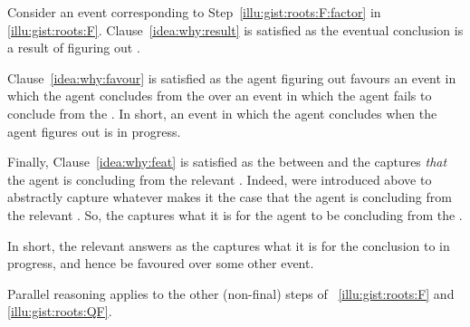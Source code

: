 \begin{note}
  Consider an event corresponding to Step~\ref{illu:gist:roots:F:factor} in \autoref{illu:gist:roots:F}.
  Clause~\ref{idea:why:result} is satisfied as the eventual conclusion is a result of figuring out \rootsConEqFac{}.

  Clause~\ref{idea:why:favour} is satisfied as the agent figuring out \rootsConEqFac{} favours an event in which the agent concludes  from the \pool{} over an event in which the agent fails to conclude  from the \pool{}.
  In short, an event in which the agent concludes  when the agent figures out \rootsConEqFac{} is in progress.

  Finally, Clause~\ref{idea:why:feat} is satisfied as the \ros{} between  and the \pool{} captures \emph{that} the agent is concluding  from the relevant \pool{}.
  Indeed,  were introduced above to abstractly capture whatever makes it the case that the agent is concluding  from the relevant \pool{}.
  So, the \ros{} captures what it is for the agent to be concluding  from the \pool{}.
\end{note}


\begin{note}
  In short, the relevant  answers \qWhy{} as the \ros{} captures what it is for the conclusion to in progress, and hence be favoured over some other event.

  Parallel reasoning applies to the other (non-final) steps of ~\ref{illu:gist:roots:F} and \ref{illu:gist:roots:QF}.
\end{note}


